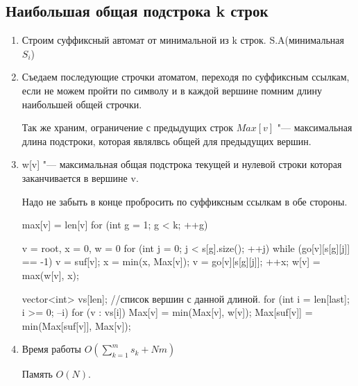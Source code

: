 \subsection{Наибольшая общая подстрока k строк}
    \begin{enumerate}
    \item Строим суффиксный автомат от минимальной из k строк. S.A(минимальная $S_i$)
    \item Съедаем последующие строчки атоматом, переходя по суффиксным ссылкам, если не 
    можем пройти по символу и в каждой вершине помним длину наибольшей общей строчки. 

    Так же храним, ограничение с предыдущих строк $Max[v]$ "--- максимальная длина 
    подстроки, которая являлвсь общей для предыдущих вершин. 
    \item 
    
    w[v] "--- максимальная общая подстрока текущей и нулевой строки которая заканчивается в вершине v. 

    Надо не забыть в конце пробросить по суффиксным ссылкам в обе стороны. 

    \begin{cppcode}
    max[v] = len[v]
    for (int g = 1; g < k; ++g) {
        v = root, x = 0, w = {0}
        for (int j = 0; j < s[g].size(); ++j) {
            while (go[v][s[g][j]] == -1) {
                v = suf[v];
                x = min(x, Max[v]);
            }
            v = go[v][s[g][j]];
            ++x;
            w[v] = max(w[v], x);
        }

        vector<int> vs[len]; //список вершин с данной длиной.
        for (int i = len[last]; i >= 0; --i) {
            for (v : vs[i]) {
                Max[v] = min(Max[v], w[v]);
                Max[suf[v]] = min(Max[suf[v]], Max[v]);
            }
        }
    }
    \end{cppcode}
    
    \item Время работы $O(\sum_{k = 1}^{m}s_k + Nm)$
    
    Память $O(N)$.
    \end{enumerate}
